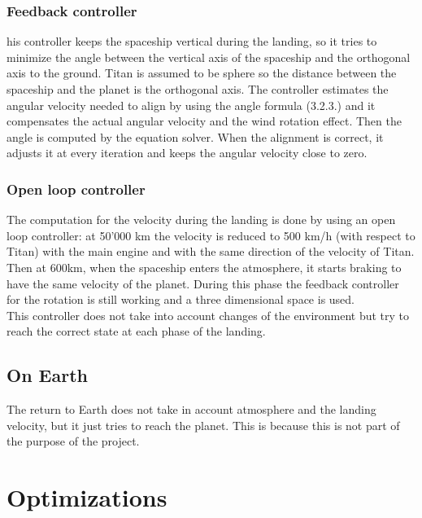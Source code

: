 \documentclass[10pt,a4paper]{article}
\begin{document}
	\subsubsection{Feedback controller}
	his controller keeps the spaceship vertical during the landing, so it tries to minimize the angle between the vertical axis of the spaceship and the orthogonal axis to the ground. Titan is assumed to be sphere so the distance between the spaceship and the planet is the orthogonal axis. The controller estimates the angular velocity needed to align by using the angle formula (3.2.3.) and it compensates the actual angular velocity and the wind rotation effect. Then the angle is computed by the equation solver. When the alignment is correct, it adjusts it at every iteration and keeps the angular velocity close to zero.
	
	\subsubsection{Open loop controller}
	The computation for the velocity during the landing is done by using an open loop controller: at 50'000 km the velocity is reduced to 500 km/h (with respect to Titan) with the main engine and with the same direction of the velocity of Titan. Then at 600km, when the spaceship enters the atmosphere, it starts braking to have the same velocity of the planet. During this phase the feedback controller for the rotation is still working and a three dimensional space is used.\\
	This controller does not take into account changes of the environment but try to reach the correct state at each phase of the landing.
	
	
	\subsection{On Earth}
	The return to Earth does not take in account atmosphere and the landing velocity, but it just tries to reach the planet. This is because this is not part of the purpose of the project.
	
	\section{Optimizations}
\end{document}
